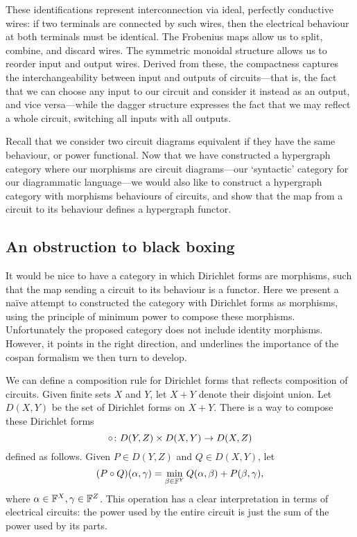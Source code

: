 These identifications represent interconnection via ideal, perfectly conductive
wires: if two terminals are connected by such wires, then the electrical
behaviour at both terminals must be identical. The Frobenius maps allow us to
split, combine, and discard wires.  The symmetric monoidal structure allows
us to reorder input and output wires. Derived from these, the compactness captures the
interchangeability between input and outputs of circuits---that is, the fact
that we can choose any input to our circuit and consider it instead as an
output, and vice versa---while the dagger structure expresses the fact that we
may reflect a whole circuit, switching all inputs with all outputs.

Recall that we consider two circuit diagrams equivalent if they have the same
behaviour, or power functional. Now that we have constructed a hypergraph
category where our morphisms are circuit diagrams---our `syntactic' category for
our diagrammatic language---we would also like to construct a hypergraph
category with morphisms behaviours of circuits, and show that the map from a
circuit to its behaviour defines a hypergraph functor.


\subsection{An obstruction to black boxing} \label{ssec.noidentities}

It would be nice to have a category in which Dirichlet forms are morphisms, such
that the map sending a circuit to its behaviour is a functor.  Here we present a
na\"ive attempt to constructed the category with Dirichlet forms as morphisms,
using the principle of minimum power to compose these morphisms.  Unfortunately
the proposed category does not include identity morphisms.  However, it points
in the right direction, and underlines the importance of the cospan formalism we
then turn to develop.

We can define a composition rule for Dirichlet forms that reflects composition
of circuits.  Given finite sets $X$ and $Y$, let $X+Y$ denote their disjoint
union.  Let $D(X,Y)$ be the set of Dirichlet forms on $X+Y$. There is a way to
compose these Dirichlet forms
\[ 
\circ {\colon} D(Y,Z) \times D(X,Y) \to D(X,Z) 
\]
defined as follows.  Given $P \in D(Y,Z)$ and $Q \in D(X,Y)$, let
\[ 
  (P \circ Q)(\alpha, \gamma) = \min_{\beta \in {\mathbb F}^Y} Q(\alpha, \beta) + P(\beta, \gamma),
\]
where $\alpha \in {\mathbb F}^X, \gamma \in {\mathbb F}^Z$. This operation has a clear
interpretation in terms of electrical circuits: the power used by the entire
circuit is just the sum of the power used by its parts. 

